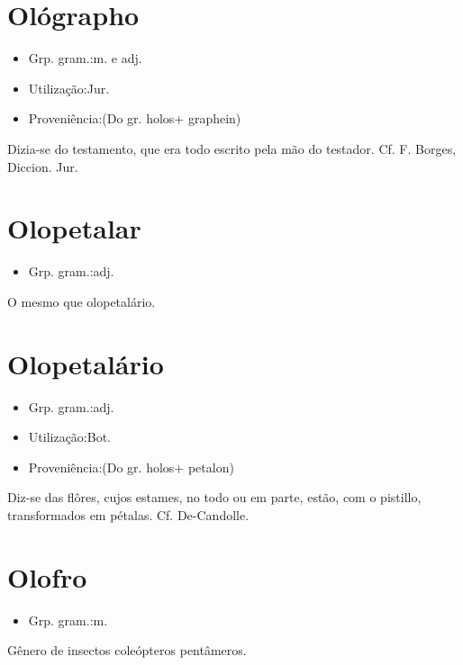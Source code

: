 \section{Ológrapho}
\begin{itemize}
\item {Grp. gram.:m.  e  adj.}
\end{itemize}
\begin{itemize}
\item {Utilização:Jur.}
\end{itemize}
\begin{itemize}
\item {Proveniência:(Do gr. \textunderscore holos\textunderscore  + \textunderscore graphein\textunderscore )}
\end{itemize}
Dizia-se do testamento, que era todo escrito pela mão do testador. Cf. F. Borges, \textunderscore Diccion. Jur.\textunderscore 
\section{Olopetalar}
\begin{itemize}
\item {Grp. gram.:adj.}
\end{itemize}
O mesmo que \textunderscore olopetalário\textunderscore .
\section{Olopetalário}
\begin{itemize}
\item {Grp. gram.:adj.}
\end{itemize}
\begin{itemize}
\item {Utilização:Bot.}
\end{itemize}
\begin{itemize}
\item {Proveniência:(Do gr. \textunderscore holos\textunderscore  + \textunderscore petalon\textunderscore )}
\end{itemize}
Diz-se das flôres, cujos estames, no todo ou em parte, estão, com o pistillo, transformados em pétalas. Cf. De-Candolle.
\section{Olofro}
\begin{itemize}
\item {Grp. gram.:m.}
\end{itemize}
Gênero de insectos coleópteros pentâmeros.
